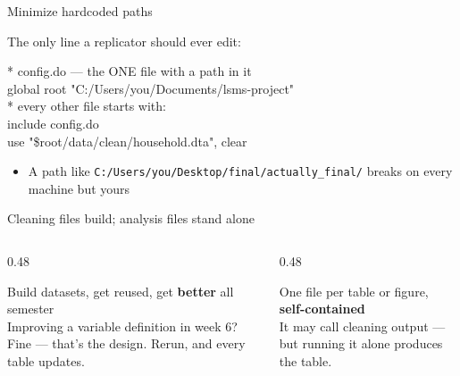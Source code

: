 \documentclass[aspectratio=169, 10pt]{beamer}
\begin{document}
\begin{frame}[fragile]{Minimize hardcoded paths}

The only line a replicator should ever edit:

\begin{tcolorbox}[codebox]
\color{white}\footnotesize\ttfamily
* config.do --- the ONE file with a path in it\\
global root "C:/Users/you/Documents/lsms-project"\\[6pt]
* every other file starts with:\\
include config.do\\
use "\$root/data/clean/household.dta", clear
\end{tcolorbox}

\vspace{0.3cm}

\begin{itemize}
  \item A path like \texttt{C:/Users/you/Desktop/final/actually\_final/} breaks on every machine but yours
\end{itemize}

\end{frame}

\begin{frame}{Cleaning files build; analysis files stand alone}

\begin{columns}[T]
\begin{column}{0.48\textwidth}
\begin{tcolorbox}[keybox, title={\faLayerGroup\quad Cleaning files}]
\footnotesize
Build datasets, get reused, get \textbf{better} all semester\\[4pt]
Improving a variable definition in week 6? Fine --- that's the design. Rerun, and every table updates.
\end{tcolorbox}
\end{column}
\begin{column}{0.48\textwidth}
\begin{tcolorbox}[keybox, title={\faFile\quad Analysis files}]
\footnotesize
One file per table or figure, \textbf{self-contained}\\[4pt]
It may call cleaning output --- but running it alone produces the table. 
\end{tcolorbox}
\end{column}
\end{columns}

%

\end{frame}
\end{document}

